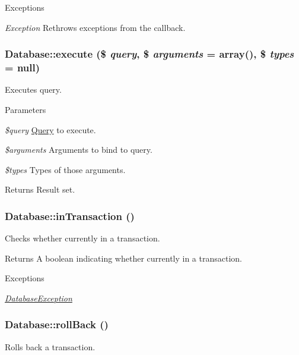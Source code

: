 \begin{DoxyExceptions}{Exceptions}
\item[{\em Exception}]Rethrows exceptions from the callback. \end{DoxyExceptions}
\hypertarget{classDatabase_a1a7d690c71fa3e350cb69fa33e7a8995}{
\subsubsection[{execute}]{\setlength{\rightskip}{0pt plus 5cm}Database::execute (\$ {\em query}, \/  \$ {\em arguments} = {\ttfamily array()}, \/  \$ {\em types} = {\ttfamily null})}}
\label{classDatabase_a1a7d690c71fa3e350cb69fa33e7a8995}
Executes query.


\begin{DoxyParams}{Parameters}
\item[{\em \$query}]\hyperlink{classQuery}{Query} to execute. \item[{\em \$arguments}]Arguments to bind to query. \item[{\em \$types}]Types of those arguments.\end{DoxyParams}
\begin{DoxyReturn}{Returns}
Result set. 
\end{DoxyReturn}
\hypertarget{classDatabase_a8eb4ff36e5aee14fea7e1956b53dea9d}{
\subsubsection[{inTransaction}]{\setlength{\rightskip}{0pt plus 5cm}Database::inTransaction ()}}
\label{classDatabase_a8eb4ff36e5aee14fea7e1956b53dea9d}
Checks whether currently in a transaction.

\begin{DoxyReturn}{Returns}
A boolean indicating whether currently in a transaction.
\end{DoxyReturn}

\begin{DoxyExceptions}{Exceptions}
\item[{\em \hyperlink{classDatabaseException}{DatabaseException}}]\end{DoxyExceptions}
\hypertarget{classDatabase_af41c84a1d533c8c650322e128112df34}{
\subsubsection[{rollBack}]{\setlength{\rightskip}{0pt plus 5cm}Database::rollBack ()}}
\label{classDatabase_af41c84a1d533c8c650322e128112df34}
Rolls back a transaction.

